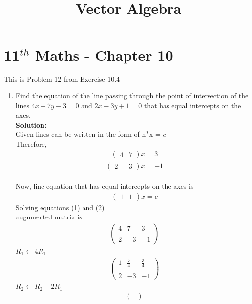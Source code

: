 \documentclass[12pt]{article}
\newcommand{\solution}{\noindent \textbf{Solution: }}
\newcommand{\myvec}[1]{\ensuremath{\begin{pmatrix}#1\end{pmatrix}}}
\begin{document}
\begin{center}
\title{\textbf{Vector Algebra}}
\date{\vspace{-5ex}} %
\maketitle
\end{center}
\setcounter{page}{1}
\section*{11$^{th}$ Maths - Chapter 10}
This is Problem-12 from Exercise 10.4
\begin{enumerate}
    \item Find the equation of the line passing through the point of intersection of the lines $4x + 7y - 3 = 0$ and $2x - 3y + 1 = 0$ that has equal intercepts on the axes.\\
    \solution \\
    Given lines can be written in the form of n$^{T}$x = $c$
   \\Therefore,\\ \begin{align}
       \myvec{4&7}x=3
   \end{align} 
   \begin{align}
       \myvec{2&-3}x=-1
   \end{align}\\
   Now, line equation that has equal intercepts on the axes is
   \begin{align}
       \myvec{1 & 1}x=c
   \end{align}
   Solving equations (1) and (2)\\augumented matrix is
  \begin{align}
\begin{pmatrix}
    4 & 7 & 3 \\ \\
    2 & -3 & -1
  \end{pmatrix}
\end{align}
$R_1 \leftarrow 4 R_1$
\begin{align}
\begin{pmatrix}
    1 & \frac{7}{4} & \frac{3}{4} \\ \\
    2 & -3 & -1
  \end{pmatrix}
\end{align}
$R_2 \leftarrow R_2 - 2R_1$
\begin{align}
\begin{pmatrix}

\end{pmatrix}
\end{align}
\end{enumerate}
\end{document}
